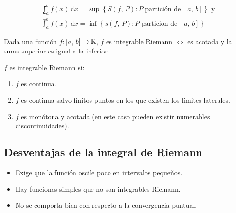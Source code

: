 \begin{align*}
     & \lowint_a^b f(x) \, \mathrm{d}x = \sup \left\{ S(f\text{, } P) : P \text{ partición de } [a\text{, } b] \right\} \text{ y } \\
     & \upint_a^b f(x) \, \mathrm{d}x = \inf \left\{ s(f\text{, } P) : P \text{ partición de } [a\text{, } b] \right\}
\end{align*}


\begin{prop}
    Dada una función $f: [a$, $b] \to \mathbb{R}$, $f$ es integrable Riemann $\iff$ es acotada y la suma superior es igual a la inferior.
\end{prop}

\begin{note}
    $f$ es integrable Riemann si: \begin{enumerate}
        \item $f$ es continua.
        \item $f$ es continua salvo finitos puntos en los que existen los límites laterales.
        \item $f$ es monótona y acotada (en este caso pueden existir numerables discontinuidades).
    \end{enumerate}
\end{note}

\subsection{Desventajas de la integral de Riemann}
\begin{itemize}
    \item Exige que la función oscile poco en intervalos pequeños.
    \item Hay funciones simples que no son integrables Riemann.
    \item No se comporta bien con respecto a la convergencia puntual.
\end{itemize}

